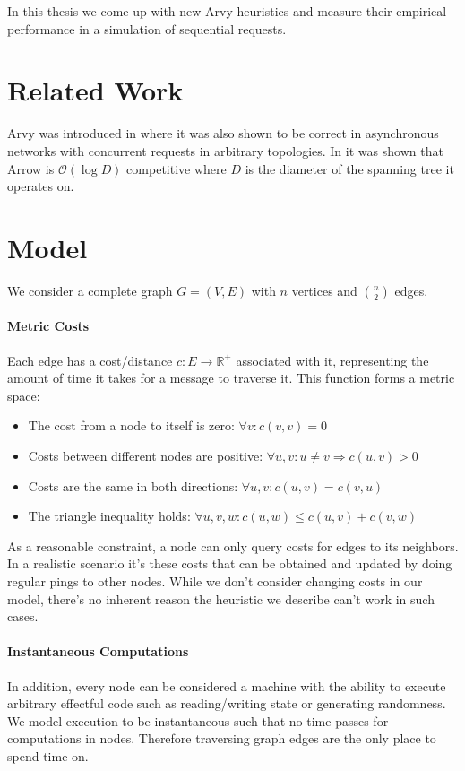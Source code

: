 \documentclass[a4paper, oneside]{discothesis}
\begin{document}
In this thesis we come up with new Arvy heuristics and measure their empirical performance in a simulation of sequential requests.

\section{Related Work}

Arvy was introduced in \cite{Arvy} where it was also shown to be correct in asynchronous networks with concurrent requests in arbitrary topologies. In \cite{Kuhn} it was shown that Arrow is $\mathcal{O}(\log D)$ competitive where $D$ is the diameter of the spanning tree it operates on. 


\newpage
\section{Model}\label{model}

We consider a complete graph $G=(V,E)$ with $n$ vertices and $\binom{n}{2}$ edges.

\paragraph{Metric Costs} Each edge has a cost/distance $c : E \rightarrow \mathbb{R}^+$ associated with it, representing the amount of time it takes for a message to traverse it. This function forms a metric space:
\begin{itemize}
\item The cost from a node to itself is zero: $\forall v:c(v, v)=0$
\item Costs between different nodes are positive: $\forall u,v : u\neq v\Rightarrow c(u,v)>0$
\item Costs are the same in both directions: $\forall u,v : c(u,v)=c(v,u)$
\item The triangle inequality holds: $\forall u,v,w : c(u,w)\leq c(u,v)+c(v,w)$
\end{itemize}

As a reasonable constraint, a node can only query costs for edges to its neighbors. In a realistic scenario it's these costs that can be obtained and updated by doing regular pings to other nodes. While we don't consider changing costs in our model, there's no inherent reason the heuristic we describe can't work in such cases.

\paragraph{Instantaneous Computations} In addition, every node can be considered a machine with the ability to execute arbitrary effectful code such as reading/writing state or generating randomness. We model execution to be instantaneous such that no time passes for computations in nodes. Therefore traversing graph edges are the only place to spend time on.
\end{document}
